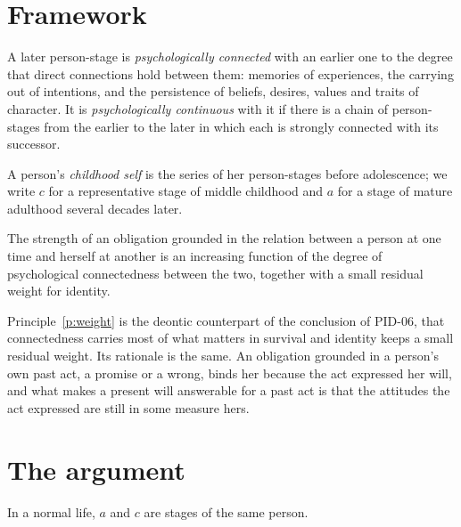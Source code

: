 \documentclass{situationist-preprint}
\begin{document}
\section{Framework}

\begin{definition}\label{d:rel}
A later person-stage is \emph{psychologically connected} with an earlier one to the degree that direct connections hold between them: memories of experiences, the carrying out of intentions, and the persistence of beliefs, desires, values and traits of character. It is \emph{psychologically continuous} with it if there is a chain of person-stages from the earlier to the later in which each is strongly connected with its successor.
\end{definition}

\begin{definition}\label{d:child}
A person's \emph{childhood self} is the series of her person-stages before adolescence; we write $c$ for a representative stage of middle childhood and $a$ for a stage of mature adulthood several decades later.
\end{definition}

\begin{principle}\label{p:weight}
The strength of an obligation grounded in the relation between a person at one time and herself at another is an increasing function of the degree of psychological connectedness between the two, together with a small residual weight for identity.
\end{principle}

Principle~\ref{p:weight} is the deontic counterpart of the conclusion of PID-06, that connectedness carries most of what matters in survival and identity keeps a small residual weight. Its rationale is the same. An obligation grounded in a person's own past act, a promise or a wrong, binds her because the act expressed her will, and what makes a present will answerable for a past act is that the attitudes the act expressed are still in some measure hers.

\section{The argument}

\begin{lemma}\label{l:id}
In a normal life, $a$ and $c$ are stages of the same person.
\end{lemma}
\end{document}
